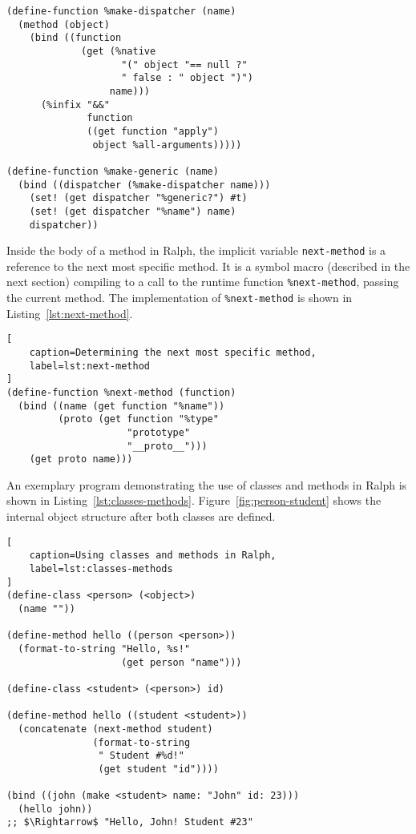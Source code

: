 \documentclass{acm_proc_article-sp}
\begin{document}
\begin{lstlisting}[label=lst:make-generic,
    caption=Definition of \texttt{\%make-generic}
]
(define-function %make-dispatcher (name)
  (method (object)
    (bind ((function
             (get (%native
                    "(" object "== null ?"
                    " false : " object ")")
                  name)))
      (%infix "&&"
              function
              ((get function "apply")
               object %all-arguments)))))

(define-function %make-generic (name)
  (bind ((dispatcher (%make-dispatcher name)))
    (set! (get dispatcher "%generic?") #t)
    (set! (get dispatcher "%name") name)
    dispatcher))
\end{lstlisting}

Inside the body of a method in Ralph, the implicit variable
\texttt{next-method} is a reference to the next most specific method.
It is a symbol macro (described in the next section) compiling to a
call to the runtime function \texttt{\%next-method}, passing the
current method. The implementation of \texttt{\%next-method} is shown
in Listing~\ref{lst:next-method}.

\begin{lstlisting}[
    caption=Determining the next most specific method,
    label=lst:next-method
]
(define-function %next-method (function)
  (bind ((name (get function "%name"))
         (proto (get function "%type"
                     "prototype"
                     "__proto__")))
    (get proto name)))
\end{lstlisting}

\pagebreak

An exemplary program demonstrating the use of classes and methods in
Ralph is shown in Listing~\ref{lst:classes-methods}.
Figure~\ref{fig:person-student} shows the internal object structure
after both classes are defined.

\begin{lstlisting}[
    caption=Using classes and methods in Ralph,
    label=lst:classes-methods
]
(define-class <person> (<object>)
  (name ""))

(define-method hello ((person <person>))
  (format-to-string "Hello, %s!"
                    (get person "name")))

(define-class <student> (<person>) id)

(define-method hello ((student <student>))
  (concatenate (next-method student)
               (format-to-string
                " Student #%d!"
                (get student "id"))))

(bind ((john (make <student> name: "John" id: 23)))
  (hello john))
;; $\Rightarrow$ "Hello, John! Student #23"
\end{lstlisting}
\end{document}
